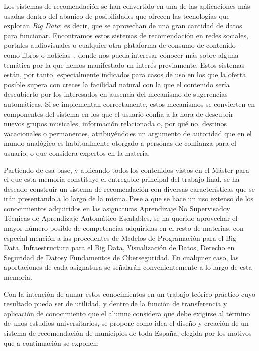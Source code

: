 
Los sistemas de recomendación se han convertido en una de las aplicaciones más usadas dentro del abanico de posibilidades que ofrecen las tecnologías que explotan \textit{Big Data}; es decir, que se aprovechan de una gran cantidad de datos para funcionar. Encontramos estos sistemas de recomendación en redes sociales, portales audiovisuales o cualquier otra plataforma de consumo de contenido –como libros o noticias–, donde nos pueda interesar conocer más sobre alguna temática por la que hemos manifestado un interés previamente. Estos sistemas están, por tanto, especialmente indicados para casos de uso en los que la oferta posible supera con creces la facilidad natural con la que el contenido sería descubierto por los interesados en ausencia del mecanismo de sugerencias automáticas. Si se implementan correctamente, estos mecanismos se convierten en componentes del sistema en los que el usuario confía a la hora de descubrir nuevos grupos musicales, información relacionada o, por qué no, destinos vacacionales o permanentes, atribuyéndoles un argumento de autoridad que en el mundo analógico es habitualmente otorgado a personas de confianza para el usuario, o que considera expertos en la materia.

Partiendo de esa base, y aplicando todos los contenidos vistos en el Máster para el que esta memoria constituye el entregable principal del trabajo final, se ha deseado construir un sistema de recomendación con diversas características que se irán presentando a lo largo de la misma. Pese a que se hace un uso extenso de los conocimientos adquiridos en las asignaturas \guillemotleft Aprendizaje No Supervisado\guillemotright\space y \guillemotleft Técnicas de Aprendizaje Automático Escalables\guillemotright, se ha querido aprovechar el mayor número posible de competencias adquiridas en el resto de materias, con especial mención a las procedentes de \guillemotleft Modelos de Programación para el Big Data\guillemotright, \guillemotleft Infraestructura para el Big Data\guillemotright, \guillemotleft Visualización de Datos\guillemotright, \guillemotleft Derecho en Seguridad de Datos\guillemotright\space y \guillemotleft Fundamentos de Ciberseguridad\guillemotright. En cualquier caso, las aportaciones de cada asignatura se señalarán convenientemente a lo largo de esta memoria.

Con la intención de aunar estos conocimientos en un trabajo teórico-práctico cuyo resultado pueda ser de utilidad, y dentro de la función de transferencia y aplicación de conocimiento que el alumno considera que debe exigirse al término de unos estudios universitarios, se propone como idea el diseño y creación de un sistema de recomendación de municipios de toda España, elegida por los motivos que a continuación se exponen:

